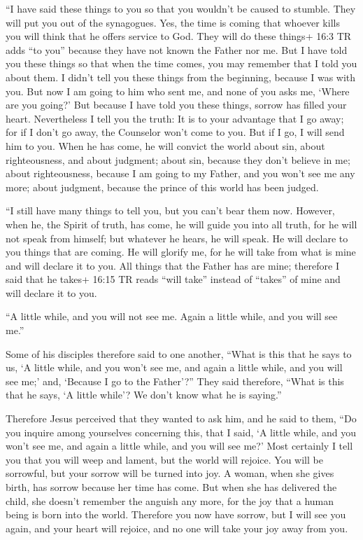  ``I have said these things to you so that you wouldn't be
caused to stumble.  They will put you out of the synagogues.
Yes, the time is coming that whoever kills you will think that he offers
service to God.  They will do these things+ 16:3 TR adds
``to you'' because they have not known the Father nor me. 
But I have told you these things so that when the time comes, you may
remember that I told you about them. I didn't tell you these things from
the beginning, because I was with you.  But now I am going
to him who sent me, and none of you asks me, `Where are you going?'
 But because I have told you these things, sorrow has filled
your heart.  Nevertheless I tell you the truth: It is to
your advantage that I go away; for if I don't go away, the Counselor
won't come to you. But if I go, I will send him to you. 
When he has come, he will convict the world about sin, about
righteousness, and about judgment;  about sin, because they
don't believe in me;  about righteousness, because I am
going to my Father, and you won't see me any more;  about
judgment, because the prince of this world has been judged.

 ``I still have many things to tell you, but you can't bear
them now.  However, when he, the Spirit of truth, has come,
he will guide you into all truth, for he will not speak from himself;
but whatever he hears, he will speak. He will declare to you things that
are coming.  He will glorify me, for he will take from what
is mine and will declare it to you.  All things that the
Father has are mine; therefore I said that he takes+ 16:15 TR reads
``will take'' instead of ``takes'' of mine and will declare it to you.

 ``A little while, and you will not see me. Again a little
while, and you will see me.''

 Some of his disciples therefore said to one another,
``What is this that he says to us, `A little while, and you won't see
me, and again a little while, and you will see me;' and, `Because I go
to the Father'?''  They said therefore, ``What is this that
he says, `A little while'? We don't know what he is saying.''

 Therefore Jesus perceived that they wanted to ask him, and
he said to them, ``Do you inquire among yourselves concerning this, that
I said, `A little while, and you won't see me, and again a little while,
and you will see me?'  Most certainly I tell you that you
will weep and lament, but the world will rejoice. You will be sorrowful,
but your sorrow will be turned into joy.  A woman, when she
gives birth, has sorrow because her time has come. But when she has
delivered the child, she doesn't remember the anguish any more, for the
joy that a human being is born into the world.  Therefore
you now have sorrow, but I will see you again, and your heart will
rejoice, and no one will take your joy away from you.

